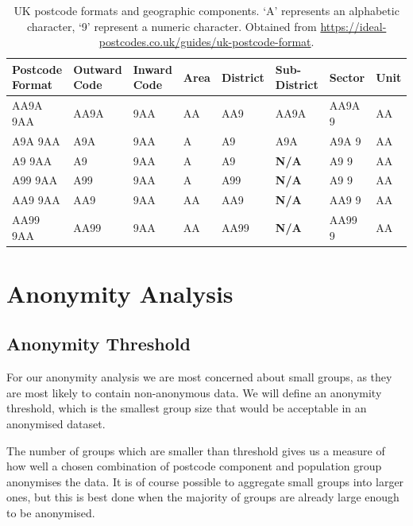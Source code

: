 \documentclass[12pt, a4paper]{article}
\begin{document}
\begin{table}[h]
\begin{center}
	\begin{tabular}{ m{}  m{}  m{}  m{}  m{}  m{}  m{}  m{}}
		\toprule
        Postcode Format & Outward Code & Inward Code & Area & District & Sub-District & Sector & Unit \\
        \midrule
		AA9A 9AA & AA9A & 9AA & AA & AA9 & AA9A & AA9A 9 & AA \\
        A9A 9AA & A9A & 9AA & A & A9 & A9A & A9A 9 & AA \\
        A9 9AA & A9 & 9AA & A & A9 & \textbf{\textbf{N/A}} & A9 9 & AA \\
        A99 9AA & A99 & 9AA & A & A99 & \textbf{N/A} & A9 9 & AA \\
        AA9 9AA & AA9 & 9AA & AA & AA9 & \textbf{N/A} & AA9 9 & AA \\
        AA99 9AA & AA99 & 9AA  & AA & AA99 & \textbf{N/A} & AA99 9 & AA\\
        \bottomrule
    \end{tabular}
\caption{UK postcode formats and geographic components. `A' represents an alphabetic character, `9' represent a numeric character. Obtained from \url{https://ideal-postcodes.co.uk/guides/uk-postcode-format}.}\label{table:postcode_format}
\end{center}
\end{table}

\section{Anonymity Analysis}
\subsection{Anonymity Threshold}

For our anonymity analysis we are most concerned about small groups, as they are most likely to contain non-anonymous data. We will define an anonymity threshold, which is the smallest group size that would be acceptable in an anonymised dataset.

 The number of groups which are smaller than threshold gives us a measure of how well a chosen combination of postcode component and population group anonymises the data. It is of course possible to aggregate small groups into larger ones, but this is best done when the majority of groups are already large enough to be anonymised.
\end{document}
